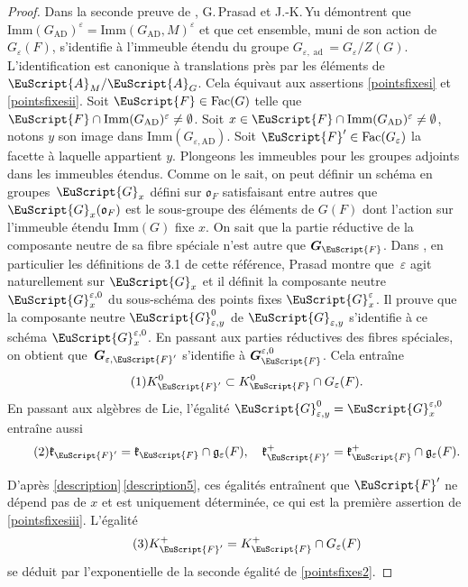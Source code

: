 \documentclass[JEP,XML,SOM,Unicode,francais]{cedram}
\let\mathcal \EuScript
\let\epsilon\varepsilon
\let\oldS\S
\renewcommand{\S}{\oldS\,}
\newcommand{\frg}{\mathfrak{g}}
\newcommand{\frk}{\mathfrak{k}}
\newcommand{\fro}{\mathfrak{o}}
\newcommand{\AD}{\mathrm{AD}}
\newcommand{\Fac}{\mathrm{Fac}}
\newcommand{\Imm}{\mathrm{Imm}}
\DeclareMathOperator{\ad}{ad}
\newcommand{\bG}{\boldsymbol{G}}
\newcommand{\cA}{\mathcal{A}}
\newcommand{\cF}{\mathcal{F}}
\newcommand{\cG}{\mathcal{G}}
\theoremstyle{plain}
\theoremstyle{definition}
\begin{document}
\begin{proof}
Dans la seconde preuve de \cite[Th.\,1.9]{PY}, G.\,Prasad et J.-K.\,Yu démon\-trent que $\Imm(G_{\AD})^{\epsilon}=\Imm(G_{\AD},M)^{\epsilon}$ et que cet ensemble, muni de son action de $G_{\epsilon}(F)$, s'identifie à l'immeuble étendu du groupe $G_{\epsilon,\ad}=G_{\epsilon}/Z(G)$. L'identification est canonique à translations près par les éléments de $\cA_{M}/\cA_{G}$. Cela équivaut aux assertions \eqref{pointsfixesi} et \eqref{pointsfixesii}. Soit $\cF\in \Fac(G)$ telle que $\cF\cap \Imm(G_{\AD})^{\epsilon}\neq\emptyset$. Soit $x\in \cF\cap \Imm(G_{\AD})^{\epsilon}\neq\emptyset$, notons $y$ son image dans $\Imm(G_{\epsilon,\AD})$. Soit $\cF'\in \Fac(G_{\epsilon})$ la facette à laquelle appartient $y$. Plongeons les immeubles pour les groupes adjoints dans les immeubles étendus. Comme on le sait, on peut définir un schéma en groupes~$\cG_{x}$ défini sur $\fro_{F}$ satisfaisant entre autres que $\cG_{x}(\fro_{F})$ est le sous-groupe des éléments de $G(F)$ dont l'action sur l'immeuble étendu $\Imm(G)$ fixe $x$. On sait que la partie réductive de la composante neutre de sa fibre spéciale n'est autre que $\bG_{\cF}$. Dans \cite[\S3]{P}, \cf en particulier les définitions de 3.1 de cette référence, Prasad montre que~$\epsilon$ agit naturellement sur $\cG_{x}$ et il définit la composante neutre $\cG_{x}^{\epsilon,0}$ du sous-schéma des points fixes $\cG_{x}^{\epsilon}$. Il prouve que la composante neutre $\cG_{\epsilon,y}^{0}$ de $\cG_{\epsilon,y}$ s'identifie à ce schéma $\cG_{x}^{\epsilon,0}$. En passant aux parties réductives des fibres spéciales, on obtient que~$\bG_{\epsilon,\cF'}$ s'identifie à $\bG_{\cF}^{\epsilon,0}$. Cela entraîne
\begin{equation}\tag{1}\label{pointsfixes1}
K_{\cF'}^0\subset K_{\cF}^0\cap G_{\epsilon}(F).
\end{equation}
En passant aux algèbres de Lie, l'égalité $\cG_{\epsilon,y}^{0}=\cG_{x}^{\epsilon,0}$ entraîne aussi
\begin{equation}\tag{2}\label{pointsfixes2}
\frk_{\cF'}=\frk_{\cF}\cap \frg_{\epsilon}(F),\quad \frk^+_{\cF'}=\frk^+_{\cF}\cap \frg_{\epsilon}(F).
\end{equation}

D'après \ref{description}\,\eqref{description5}, ces égalités entraînent que $\cF'$ ne dépend pas de $x$ et est uniquement déterminée, ce qui est la première assertion de \eqref{pointsfixesiii}.
L'égalité
\begin{equation}\tag{3}\label{pointsfixes3}
K_{\cF'}^+=K_{\cF}^+\cap G_{\epsilon}(F)
\end{equation}
se déduit par l'exponentielle de la seconde égalité de \eqref{pointsfixes2}.


\end{proof}
\end{document}
